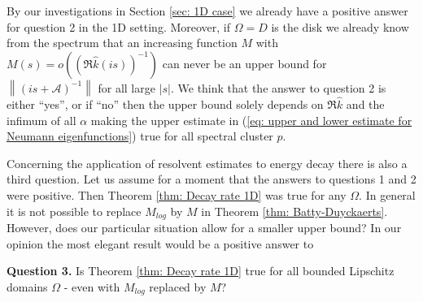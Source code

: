 \documentclass{amsart}
\newcommand{\abs}[1]{\left|#1\right|}
\newcommand{\norm}[1]{\left\| #1 \right\|}
\newcommand{\A}{\mathcal{A}}
\newcommand{\khat}{\hat{k}}
\begin{document}
By our investigations in Section \ref{sec: 1D case} we already have a positive answer for question 2 in the 1D setting. Moreover, if $\Omega=D$ is the disk we already know from the spectrum that an increasing function $M$ with $M(s)=o((\Re\khat(is))^{-1})$ can never be an upper bound for $\norm{(is+\A)^{-1}}$ for all large $\abs{s}$. We think that the answer to question 2 is either ``yes'', or if ``no'' then the upper bound solely depends on $\Re\khat$ and the infimum of all $\alpha$ making the upper estimate in (\ref{eq: upper and lower estimate for Neumann eigenfunctions}) true for all spectral cluster $p$. 

Concerning the application of resolvent estimates to energy decay there is also a third question. Let us assume for a moment that the answers to questions 1 and 2 were positive. Then Theorem \ref{thm: Decay rate 1D} was true for any $\Omega$. In general it is not possible to replace $M_{log}$ by $M$ in Theorem \ref{thm: Batty-Duyckaerts}. However, does our particular situation allow for a smaller upper bound? In our opinion the most elegant result would be a positive answer to 

\textbf{Question 3.} Is Theorem \ref{thm: Decay rate 1D} true for all bounded Lipschitz domains $\Omega$ - even with $M_{log}$ replaced by $M$?
\end{document}
